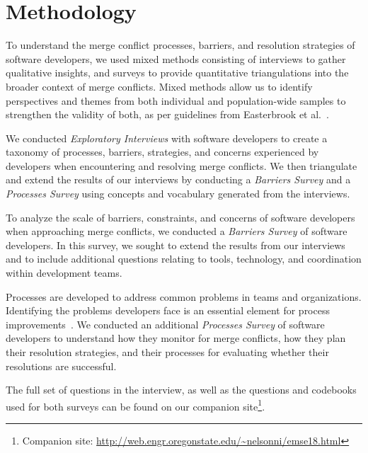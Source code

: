 
\section{Methodology}\label{methodology}


To understand the merge conflict processes, barriers, and resolution strategies of software developers, we used mixed methods consisting of interviews to gather qualitative insights, and surveys to provide quantitative triangulations into the broader context of merge conflicts.
Mixed methods allow us to identify perspectives and themes from both individual and population-wide samples to strengthen the validity of both, as per guidelines from Easterbrook et al.~\cite{easterbrook2008selecting}.

We conducted \textit{Exploratory Interviews} with software developers to create a taxonomy of processes, barriers, strategies, and concerns experienced by developers when encountering and resolving merge conflicts.
We then triangulate and extend the results of our interviews by conducting a \textit{Barriers Survey} and a \textit{Processes Survey} using concepts and vocabulary generated from the interviews. 

To analyze the scale of barriers, constraints, and concerns of software developers when approaching merge conflicts, we conducted a \textit{Barriers Survey} of software developers.
In this survey, we sought to extend the results from our interviews and to include additional questions relating to tools, technology, and coordination within development teams.

Processes are developed to address common problems in teams and organizations.
Identifying the problems developers face is an essential element for process improvements~\cite{beecham2003software}.
We conducted an additional \textit{Processes Survey} of software developers to understand how they monitor for merge conflicts, how they plan their resolution strategies, and their processes for evaluating whether their resolutions are successful.

The full set of questions in the interview, as well as the questions and codebooks used for both surveys can be found on our companion site\footnote{Companion site: \url{http://web.engr.oregonstate.edu/~nelsonni/emse18.html}}.

